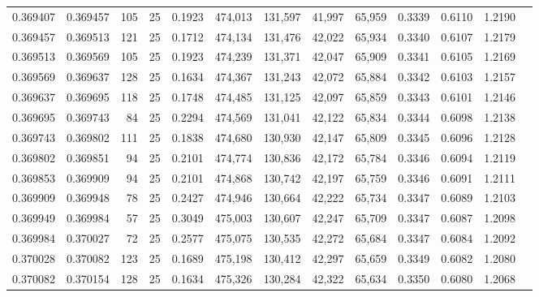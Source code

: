 \begin{tabular}{rrrrrrrrrrrrr}
0.369407 & 0.369457 &   105 &  25 &                                     0.1923 & 474,013 & 131,597 &  41,997 &  65,959 & 0.3339 & 0.6110 & 1.2190 \\
0.369457 & 0.369513 &   121 &  25 &                                     0.1712 & 474,134 & 131,476 &  42,022 &  65,934 & 0.3340 & 0.6107 & 1.2179 \\
0.369513 & 0.369569 &   105 &  25 &                                     0.1923 & 474,239 & 131,371 &  42,047 &  65,909 & 0.3341 & 0.6105 & 1.2169 \\
0.369569 & 0.369637 &   128 &  25 &                                     0.1634 & 474,367 & 131,243 &  42,072 &  65,884 & 0.3342 & 0.6103 & 1.2157 \\
0.369637 & 0.369695 &   118 &  25 &                                     0.1748 & 474,485 & 131,125 &  42,097 &  65,859 & 0.3343 & 0.6101 & 1.2146 \\
0.369695 & 0.369743 &    84 &  25 &                                     0.2294 & 474,569 & 131,041 &  42,122 &  65,834 & 0.3344 & 0.6098 & 1.2138 \\
0.369743 & 0.369802 &   111 &  25 &                                     0.1838 & 474,680 & 130,930 &  42,147 &  65,809 & 0.3345 & 0.6096 & 1.2128 \\
0.369802 & 0.369851 &    94 &  25 &                                     0.2101 & 474,774 & 130,836 &  42,172 &  65,784 & 0.3346 & 0.6094 & 1.2119 \\
0.369853 & 0.369909 &    94 &  25 &                                     0.2101 & 474,868 & 130,742 &  42,197 &  65,759 & 0.3346 & 0.6091 & 1.2111 \\
0.369909 & 0.369948 &    78 &  25 &                                     0.2427 & 474,946 & 130,664 &  42,222 &  65,734 & 0.3347 & 0.6089 & 1.2103 \\
0.369949 & 0.369984 &    57 &  25 &                                     0.3049 & 475,003 & 130,607 &  42,247 &  65,709 & 0.3347 & 0.6087 & 1.2098 \\
0.369984 & 0.370027 &    72 &  25 &                                     0.2577 & 475,075 & 130,535 &  42,272 &  65,684 & 0.3347 & 0.6084 & 1.2092 \\
0.370028 & 0.370082 &   123 &  25 &                                     0.1689 & 475,198 & 130,412 &  42,297 &  65,659 & 0.3349 & 0.6082 & 1.2080 \\
0.370082 & 0.370154 &   128 &  25 &                                     0.1634 & 475,326 & 130,284 &  42,322 &  65,634 & 0.3350 & 0.6080 & 1.2068 \\

\end{tabular}
